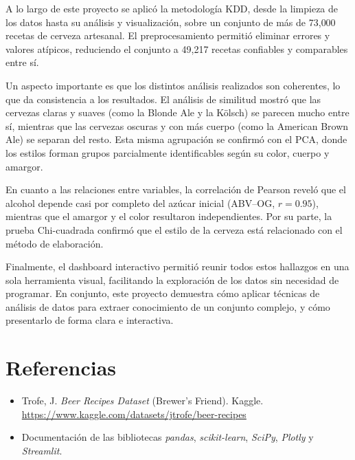 \documentclass[11pt]{article}
\begin{document}
A lo largo de este proyecto se aplicó la metodología KDD, desde la limpieza de los
datos hasta su análisis y visualización, sobre un conjunto de más de 73{,}000
recetas de cerveza artesanal. El preprocesamiento permitió eliminar errores y
valores atípicos, reduciendo el conjunto a 49{,}217 recetas confiables y comparables
entre sí.

Un aspecto importante es que los distintos análisis realizados son coherentes, lo que da consistencia a los resultados. 
El análisis de similitud mostró que las cervezas claras y suaves (como la Blonde Ale y la Kölsch) se parecen
mucho entre sí, mientras que las cervezas oscuras y con más cuerpo (como la American
Brown Ale) se separan del resto. Esta misma agrupación se confirmó con el PCA, donde
los estilos forman grupos parcialmente identificables según su color, cuerpo y
amargor.

En cuanto a las relaciones entre variables, la correlación de Pearson reveló que el
alcohol depende casi por completo del azúcar inicial (ABV--OG, $r = 0.95$), mientras
que el amargor y el color resultaron independientes. Por su parte, la prueba
Chi-cuadrada confirmó que el estilo de la cerveza está relacionado con el método de
elaboración.

Finalmente, el dashboard interactivo permitió reunir todos estos hallazgos en una
sola herramienta visual, facilitando la exploración de los datos sin necesidad de
programar. En conjunto, este proyecto demuestra cómo aplicar técnicas de análisis de datos
para extraer conocimiento de un conjunto complejo, y cómo presentarlo de forma clara e interactiva.


\section*{Referencias}
\begin{itemize}
    \item Trofe, J. \textit{Beer Recipes Dataset} (Brewer's Friend). Kaggle.
    \url{https://www.kaggle.com/datasets/jtrofe/beer-recipes}
    \item Documentación de las bibliotecas \textit{pandas}, \textit{scikit-learn},
    \textit{SciPy}, \textit{Plotly} y \textit{Streamlit}.
\end{itemize}
\end{document}
